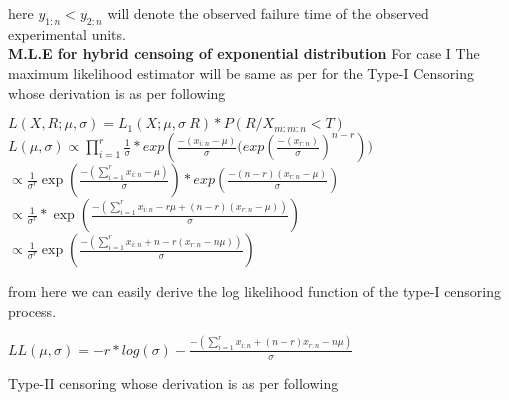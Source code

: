 \documentclass[12pt]{article}
\begin{document}
 here $y_{1:n} < y_{2:n} $ will denote the observed failure time of the observed experimental units.\\
 
 \textbf{M.L.E for hybrid censoing of exponential distribution}
 For case I The maximum likelihood estimator will be same as per for the Type-I Censoring whose derivation is as per following\\
 \begin{center}
  $L(X,R;\mu,\sigma)=L_{1}(X;\mu,\sigma \ R)*P(R / X_{m:m:n}< T)$\\
 
 $L(\mu,\sigma) \propto \prod_{i=1}^{r}\frac{1}{\sigma} * exp(\frac{-(x_{i:n}-\mu)}{\sigma}{(exp(\frac{-(x_{r:n})}{\sigma})}^{n-r}))$\\
 $\propto \frac{1}{\sigma^r} \exp(\frac{-(\sum_{i=1}^{r} x_{i:n}-\mu)}{\sigma})* exp(\frac{-(n-r)(x_{r:n}-\mu)}{\sigma})$\\
 $\propto \frac{1}{\sigma^r}*\exp(\frac{-(\sum_{i=1}^{r} x_{i:n} - r\mu+(n-r)(x_{r:n}-\mu))}{\sigma})$\\
 $\propto \frac{1}{\sigma^r} \exp(\frac{-(\sum_{i=1}^{r} x_{i:n} +n-r(x_{r:n}-n\mu))}{\sigma})$
 \begin{flushleft}
 	from here we can easily derive the log likelihood function of the type-I censoring process.
  \end{flushleft}
   $LL(\mu,\sigma)=-r*log(\sigma)-\frac{-(\sum_{i=1}^{r}x_{i:n}+(n-r)x_{r:n}-n\mu)}{\sigma}$	
 \end{center}
 
Type-II censoring whose derivation is as per following\\
\begin{center}
	
\end{center}

 
 
 
 
 
\end{document}
